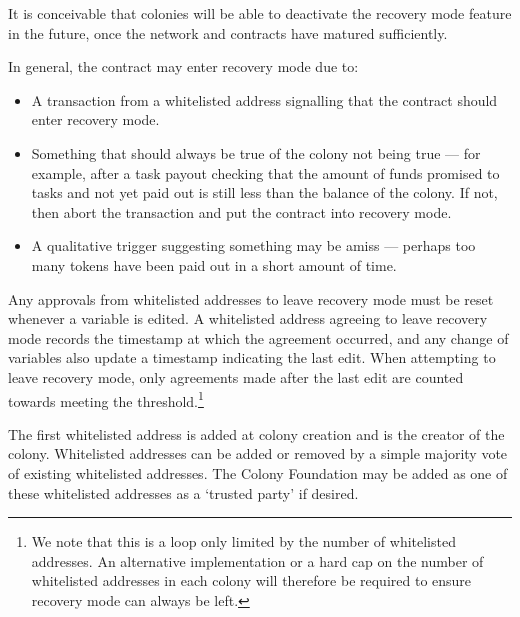 It is conceivable that colonies will be able to deactivate the recovery mode feature in the future, once the network and contracts have matured sufficiently.

In general, the contract may enter recovery mode due to:
\begin{itemize}
 \item A transaction from a whitelisted address signalling that the contract should enter recovery mode.
 \item Something that should always be true of the colony not being true --- for example, after a task payout checking that the amount of funds promised to tasks and not yet paid out is still less than the balance of the colony. If not, then abort the transaction and put the contract into recovery mode.
 \item A qualitative trigger suggesting something may be amiss --- perhaps too many tokens have been paid out in a short amount of time.
\end{itemize}

Any approvals from whitelisted addresses to leave recovery mode must be reset whenever a variable is edited. A whitelisted address agreeing to leave recovery mode records the timestamp at which the agreement occurred, and any change of variables also update a timestamp indicating the last edit. When attempting to leave recovery mode, only agreements made after the last edit are counted towards meeting the threshold.\footnote{We note that this is a loop only limited by the number of whitelisted addresses. An alternative implementation or a hard cap on the number of whitelisted addresses in each colony will therefore be required to ensure recovery mode can always be left.}

The first whitelisted address is added at colony creation and is the creator of the colony. Whitelisted addresses can be added or removed by a simple majority vote of existing whitelisted addresses. The Colony Foundation may be added as one of these whitelisted addresses as a `trusted party' if desired.